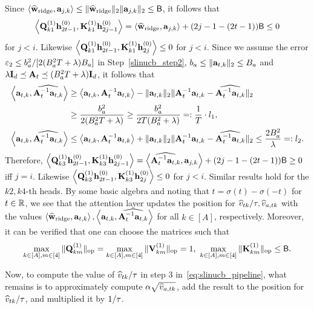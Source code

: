 Since $\left\langle\widehat{{\mathbf w}}_{{\rm ridge}},{\mathbf a}_{j,k}\right\rangle\leq \|\widehat{{\mathbf w}}_{{\rm ridge}}\|_2\|{\mathbf a}_{j,k}\|_2\leq{\mathsf{B}}$, it follows that $$\left\langle{\mathbf Q}^{(1)}_{k1}{\mathbf h}^{(0)}_{2t-1},{\mathbf K}^{(1)}_{k1}{\mathbf h}^{(0)}_{2j-1}\right\rangle=\left\langle\widehat{{\mathbf w}}_{{\rm ridge}},{\mathbf a}_{j,k}\right\rangle+(2j-1-(2t-1)){\mathsf{B}}\leq 0$$ for $j<i$. Likewise $\left\langle{\mathbf Q}^{(1)}_{k1}{\mathbf h}^{(0)}_{2t-1},{\mathbf K}^{(1)}_{k1}{\mathbf h}^{(0)}_{2j}\right\rangle\leq0$ for $j<i$.
Since we assume the error $\varepsilon_2\leq b_a^2/[2(B_a^2T+\lambda)B_a]$
in Step~\ref{slinucb_step2}, $b_a\leq\|{\mathbf a}_{t,k}\|_2\leq B_a$ and $\lambda{\mathbf I}_d\preceq{\mathbf A}_t\preceq (B_a^2T+\lambda){\mathbf I}_d$, it follows that
\begin{align}
    \left\langle{\mathbf a}_{t,k},\widehat{{\mathbf A}_t^{-1}{\mathbf a}_{t,k}}\right\rangle
    &\geq
    \left\langle{\mathbf a}_{t,k},{{\mathbf A}_t^{-1}{\mathbf a}_{t,k}}\right\rangle-\|{\mathbf a}_{t,k}\|_2\|{\mathbf A}_t^{-1}{\mathbf a}_{t,k}-\widehat{{\mathbf A}_t^{-1}{\mathbf a}_{t,k}}\|_2\notag\\
    &\geq \frac{b_a^2}{2(B_a^2T+\lambda)}\geq \frac{b_a^2}{2T(B_a^2+\lambda)}=:\frac{1}{T}\cdot{{l_1}},\label{eq:lb_qudratic}
    \\
     \left\langle{\mathbf a}_{t,k},\widehat{{\mathbf A}_t^{-1}{\mathbf a}_{t,k}}\right\rangle
     &\leq
     \left\langle{\mathbf a}_{t,k},{{\mathbf A}_t^{-1}{\mathbf a}_{t,k}}\right\rangle+\|{\mathbf a}_{t,k}\|_2\|{\mathbf A}_t^{-1}{\mathbf a}_{t,k}-\widehat{{\mathbf A}_t^{-1}{\mathbf a}_{t,k}}\|_2\leq \frac{2B_a^2}{\lambda}=:{l_2}.\label{eq:ub_qudratic}
\end{align}
Therefore,  $\left\langle{\mathbf Q}^{(1)}_{k3}{\mathbf h}^{(0)}_{2t-1},{\mathbf K}^{(1)}_{k3}{\mathbf h}^{(0)}_{2j-1}\right\rangle=\left\langle\widehat{{\mathbf A}_t^{-1}{\mathbf a}_{t,k}},{\mathbf a}_{j,k}\right\rangle+(2j-1-(2t-1)){\mathsf{B}}\geq 0$ iff $j=i$. Likewise $\left\langle{\mathbf Q}^{(1)}_{k3}{\mathbf h}^{(0)}_{2t-1},{\mathbf K}^{(1)}_{k3}{\mathbf h}^{(0)}_{2j}\right\rangle\leq 0$  for $j<i$. Similar results hold for the $k2,k4$-th heads.  By some basic algebra and noting that $t=\sigma(t)-\sigma(-t)$ for $t\in\mathbb{R}$, we see that the attention layer updates the position for $\widehat v_{tk}/{\tau},\widehat v_{a,tk}$ with the values $\left\langle\widehat{{\mathbf w}}_{{\rm ridge}},{\mathbf a}_{t,k}\right\rangle, \left\langle{\mathbf a}_{t,k},\widehat{{\mathbf A}_t^{-1}{\mathbf a}_{t,k}}\right\rangle$ for all $k\in[A]$, respectively.  Moreover, it can be verified that one can choose the matrices such that $$\max_{k\in[A],m\in[4]}\|{{\mathbf Q}_{km}^{(1)}}\|_{\mathrm{op}}=\max_{k\in[A],m\in[4]}\|{{\mathbf V}_{km}^{(1)}}\|_{\mathrm{op}}=1,~\max_{k\in[A],m\in[4]}\|{{\mathbf K}^{(1)}_{km}}\|_{\mathrm{op}}\leq{\mathsf{B}}.$$




Now, to compute the value of $\widehat v_{tk}/{\tau}$ in step 3 in~\eqref{eq:slinucb_pipeline}, what remains  is to  approximately compute ${\alpha}\sqrt{\widehat v_{a,tk}}$, add the result to the position for $\widehat v_{tk}/{\tau}$, and multiplied it by $1/{\tau}$.

